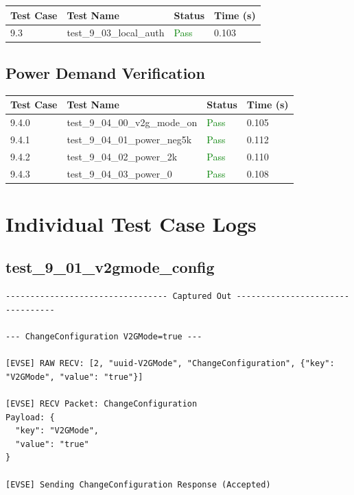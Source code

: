 \documentclass{article}
\begin{document}
\begin{longtable}{p{} p{} p{} p{}}
\toprule
\textbf{Test Case} & \textbf{Test Name} & \textbf{Status} & \textbf{Time (s)} \\
\midrule
\endhead
9.3 & test\_9\_03\_local\_auth & \textcolor{green}{Pass} & 0.103 \\
\bottomrule
\end{longtable}
\subsection{Power Demand Verification}

\begin{longtable}{p{} p{} p{} p{}}
\toprule
\textbf{Test Case} & \textbf{Test Name} & \textbf{Status} & \textbf{Time (s)} \\
\midrule
\endhead
9.4.0 & test\_9\_04\_00\_v2g\_mode\_on & \textcolor{green}{Pass} & 0.105 \\
9.4.1 & test\_9\_04\_01\_power\_neg5k & \textcolor{green}{Pass} & 0.112 \\
9.4.2 & test\_9\_04\_02\_power\_2k & \textcolor{green}{Pass} & 0.110 \\
9.4.3 & test\_9\_04\_03\_power\_0 & \textcolor{green}{Pass} & 0.108 \\
\bottomrule
\end{longtable}
\section{Individual Test Case Logs}\subsection*{test\_9\_01\_v2gmode\_config}
\begin{lstlisting}
--------------------------------- Captured Out ---------------------------------

--- ChangeConfiguration V2GMode=true ---

[EVSE] RAW RECV: [2, "uuid-V2GMode", "ChangeConfiguration", {"key": "V2GMode", "value": "true"}]

[EVSE] RECV Packet: ChangeConfiguration
Payload: {
  "key": "V2GMode",
  "value": "true"
}

[EVSE] Sending ChangeConfiguration Response (Accepted)
\end{lstlisting}
\end{document}
